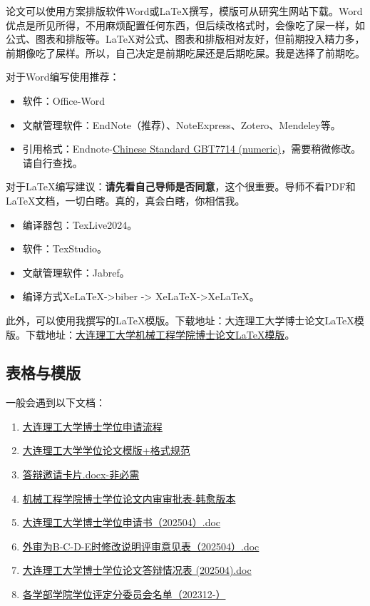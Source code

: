 \documentclass[12pt,a4paper]{ctexart}
\begin{document}
论文可以使用方案排版软件Word或\LaTeX 撰写，模版可从研究生网站下载。Word优点是所见所得，不用麻烦配置任何东西，但后续改格式时，会像吃了屎一样，如公式、图表和排版等。\LaTeX 对公式、图表和排版相对友好，但前期投入精力多，前期像吃了屎样。所以，自己决定是前期吃屎还是后期吃屎。我是选择了前期吃。

对于Word编写使用推荐：
\begin{itemize}
\item 软件：Office-Word
\item 文献管理软件：EndNote（推荐）、NoteExpress、Zotero、Mendeley等。
\item 引用格式：Endnote-\href{https://endnote.com/downloads/styles/chinese-standard-gb-t7714-numeric/?srsltid=AfmBOor20AgTDOjwFDm6fJqbAP8A6gGHeKBfwV-UuxWS9wOtau8e8W6M}{Chinese Standard GBT7714 (numeric)}，需要稍微修改。请自行查找。
 \end{itemize}

  对于\LaTeX 编写建议：\textbf{请先看自己导师是否同意}，这个很重要。导师不看PDF和\LaTeX 文档，一切白瞎。真的，真会白瞎，你相信我。
  \begin{itemize}
    \item 编译器包：TexLive2024。
\item 软件：TexStudio。
\item 文献管理软件：Jabref。
\item 编译方式Xe\LaTeX ->biber -> Xe\LaTeX ->Xe\LaTeX。
 \end{itemize}

 
 此外，可以使用我撰写的\LaTeX 模版。下载地址：大连理工大学博士论文\LaTeX 模版。下载地址：\href{https://github.com/DrHanks91/DUT_PhD_Thesis_Template}{大连理工大学机械工程学院博士论文LaTeX模版}。
 

 \subsection{表格与模版}
 \label{sec:listRequire}

一般会遇到以下文档：
 \begin{enumerate}
   \item \href{https://gs.dlut.edu.cn/info/1207/3994.htm}{大连理工大学博士学位申请流程}
 \item \href{https://gs.dlut.edu.cn/info/1210/13916.htm}{大连理工大学学位论文模版+格式规范}
\item \href{https://github.com/DrHanks91/DUTMePhDProcess}{答辩邀请卡片.docx-非必需}   
 \item \href{https://github.com/DrHanks91/DUTMePhDProcess}{机械工程学院博士学位论文内审审批表-韩愈版本}
 \item \href{https://gs.dlut.edu.cn/info/1207/8541.htm}{大连理工大学博士学位申请书（202504）.doc}
 \item \href{https://gs.dlut.edu.cn/info/1207/8541.htm}{外审为B-C-D-E时修改说明评审意见表（202504）.doc}
 \item \href{https://gs.dlut.edu.cn/info/1207/8541.htm}{大连理工大学博士学位论文答辩情况表 (202504).doc}
 \item \href{https://gs.dlut.edu.cn/info/1209/13422.htm}{各学部学院学位评定分委员会名单（202312-）}
 \end{enumerate}
\end{document}
